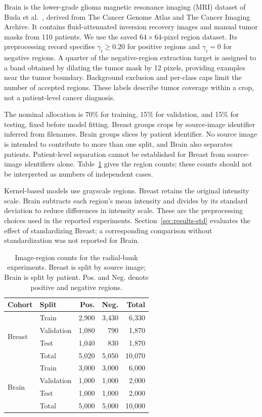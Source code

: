 \documentclass[10pt,twocolumn]{article}
\begin{document}
Brain is the lower-grade glioma magnetic resonance imaging (MRI) dataset of Buda et al.\ \cite{buda2019}, derived from The Cancer Genome Atlas and The Cancer Imaging Archive. It contains fluid-attenuated inversion recovery images and manual tumor masks from 110 patients. We use the saved $64\times64$-pixel region dataset. Its preprocessing record specifies $\gamma_i\geq0.20$ for positive regions and $\gamma_i=0$ for negative regions. A quarter of the negative-region extraction target is assigned to a band obtained by dilating the tumor mask by 12 pixels, providing examples near the tumor boundary. Background exclusion and per-class caps limit the number of accepted regions. These labels describe tumor coverage within a crop, not a patient-level cancer diagnosis.

The nominal allocation is 70\% for training, 15\% for validation, and 15\% for testing, fixed before model fitting. Breast groups crops by source-image identifier inferred from filenames. Brain groups slices by patient identifier. No source image is intended to contribute to more than one split, and Brain also separates patients. Patient-level separation cannot be established for Breast from source-image identifiers alone. Table~\ref{tab:datasets} gives the region counts; these counts should not be interpreted as numbers of independent cases.

Kernel-based models use grayscale regions. Breast retains the original intensity scale. Brain subtracts each region's mean intensity and divides by its standard deviation to reduce differences in intensity scale. These are the preprocessing choices used in the reported experiments. Section~\ref{sec:results-std} evaluates the effect of standardizing Breast; a corresponding comparison without standardization was not reported for Brain.

\begin{table}[!t]
\centering
\caption{Image-region counts for the radial-bank experiments. Breast is split by source image; Brain is split by patient. Pos. and Neg. denote positive and negative regions.}
\label{tab:datasets}
\footnotesize
\begin{tabular}{llrrr}
\toprule
Cohort & Split & Pos. & Neg. & Total\\
\midrule
\multirow{4}{*}{Breast} & Train & 2,900 & 3,430 & 6,330\\
 & Validation & 1,080 & 790 & 1,870\\
 & Test & 1,040 & 830 & 1,870\\
 & Total & 5,020 & 5,050 & 10,070\\
\midrule
\multirow{4}{*}{Brain} & Train & 3,000 & 3,000 & 6,000\\
 & Validation & 1,000 & 1,000 & 2,000\\
 & Test & 1,000 & 1,000 & 2,000\\
 & Total & 5,000 & 5,000 & 10,000\\
\bottomrule
\end{tabular}
\end{table}
\end{document}
